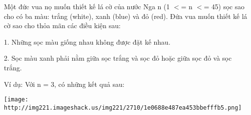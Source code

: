 Một đức vua nọ muốn thiết kế lá cờ của nước Nga n (1 $<$= n $<$= 45) sọc sao cho có ba màu: trắng (white), xanh (blue) và đỏ (red). Đứa vua muốn thiết kế lá cờ sao cho thỏa mãn các điều kiện sau:

1. Những sọc màu giống nhau không được đặt kế nhau.

2. Sọc màu xanh phải nằm giữa sọc trắng và sọc đỏ hoặc giữa sọc đỏ và sọc trắng.

Ví dụ: Với n = 3, có những kết quả sau:


\texttt{[image: http://img221.imageshack.us/img221/2710/1e0688e487ea453bbefffb5.png]}